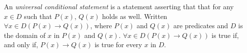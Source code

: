 \guard




\begin{defn}
\label{defn:universalConditionalStatement}
	An \emph{universal conditional statement} is a statement asserting that that for any $x\in D$ such that $P(x)$, $Q(x)$ holds as well.
	Written $\forall x\in D(P(x)\rightarrow Q(x) )$, where  $P(x)$ and $Q(x)$ are predicates and $D$ is the domain of $x$ in $P(x)$ and $Q(x)$.
	$\forall x\in D(P(x)\rightarrow Q(x))$ is true if, and only if, $P(x)\rightarrow Q(x)$ is true for every $x$ in $D$.
\end{defn}
